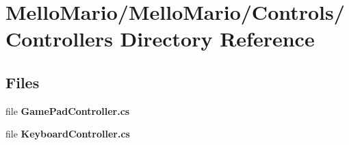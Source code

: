\section{Mello\+Mario/\+Mello\+Mario/\+Controls/\+Controllers Directory Reference}
\label{dir_c91a569d5f6c4ad03c7db2f86c8707db}
\subsection*{Files}
\begin{DoxyCompactItemize}
\item 
file \textbf{ Game\+Pad\+Controller.\+cs}
\item 
file \textbf{ Keyboard\+Controller.\+cs}
\end{DoxyCompactItemize}
